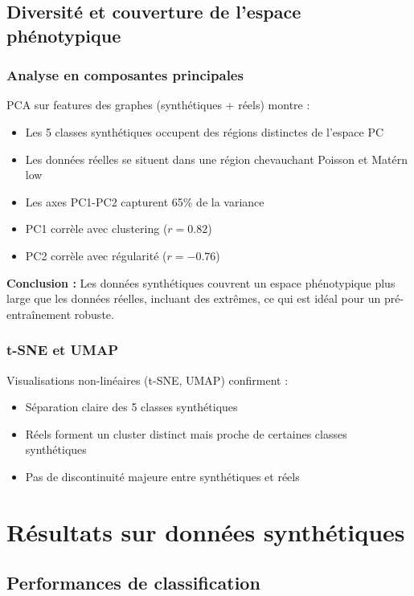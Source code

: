 \subsection{Diversité et couverture de l'espace phénotypique}

\subsubsection{Analyse en composantes principales}

PCA sur features des graphes (synthétiques + réels) montre :
\begin{itemize}
    \item Les 5 classes synthétiques occupent des régions distinctes de l'espace PC
    \item Les données réelles se situent dans une région chevauchant Poisson et Matérn low
    \item Les axes PC1-PC2 capturent 65\% de la variance
    \item PC1 corrèle avec clustering ($r = 0.82$)
    \item PC2 corrèle avec régularité ($r = -0.76$)
\end{itemize}

\textbf{Conclusion :}
Les données synthétiques couvrent un espace phénotypique plus large que les données réelles, incluant des extrêmes, ce qui est idéal pour un pré-entraînement robuste.

\subsubsection{t-SNE et UMAP}

Visualisations non-linéaires (t-SNE, UMAP) confirment :
\begin{itemize}
    \item Séparation claire des 5 classes synthétiques
    \item Réels forment un cluster distinct mais proche de certaines classes synthétiques
    \item Pas de discontinuité majeure entre synthétiques et réels
\end{itemize}

\section{Résultats sur données synthétiques}

\subsection{Performances de classification}

